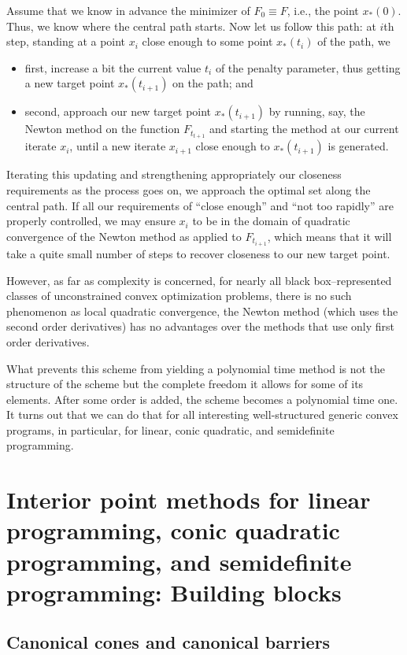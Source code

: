 \documentclass[11pt,a4paper]{article}
\begin{document}
Assume that we know in advance the minimizer of $F_0 \equiv F$, i.e., the point $x_*(0)$. Thus, we know where the central path starts. Now let us follow this path: at $i$th step, standing at a point $x_i$ close enough to some point $x_*(t_i)$ of the path, we
\begin{itemize}
\item first, increase a bit the current value $t_i$ of the penalty parameter, thus getting a new target point $x_*(t_{i+1})$ on the path; and
\item second, approach our new target point $x_*(t_{i+1})$ by running, say, the Newton method on the function $F_{t_{t+1}}$ and starting the method at our current iterate $x_i$, until a new iterate $x_{i+1}$ close enough to $x_*(t_{i+1})$ is generated.
\end{itemize}

Iterating this updating and strengthening appropriately our closeness requirements as the process goes on, we approach the optimal set along the central path. If all our requirements of “close enough” and “not too rapidly” are properly controlled, we may ensure $x_i$ to be in the domain of quadratic convergence of the Newton method as applied to $F_{t_{i+1}}$, which means that it will take a quite small number of steps to recover closeness to our new target point.

However, as far as complexity is concerned, for nearly all black box–represented classes of unconstrained convex optimization problems, there is no such phenomenon as local quadratic convergence, the Newton method (which uses the second order derivatives) has no advantages over the methods that use only first order derivatives.

What prevents this scheme from yielding a polynomial time method is not the structure of the scheme but the complete freedom it allows for some of its elements. After some order is added, the scheme becomes a polynomial
time one. It turns out that we can do that for all interesting well-structured generic convex programs, in particular, for linear, conic quadratic, and semidefinite programming.

\section{Interior point methods for linear programming, conic quadratic programming, and semidefinite programming: Building blocks}

\subsection{Canonical cones and canonical barriers}
\end{document}

